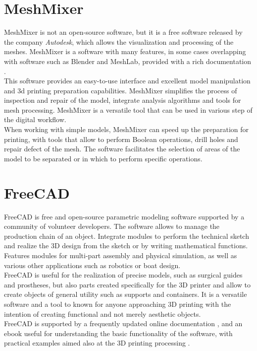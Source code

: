 \section{MeshMixer}
MeshMixer \parencite{Reference38} is not an open-source software, but it is a free software released by the company \emph{Autodesk}, which allows the visualization and processing of the meshes. MeshMixer is a software with many features, in some cases overlapping with software such as Blender and MeshLab, provided with a rich documentation \parencite{Reference39}. \\
This software provides an easy-to-use interface and excellent model manipulation and 3d printing preparation capabilities. MeshMixer simplifies the process of inspection and repair of the model, integrate analysis algorithms and tools for mesh processing. MeshMixer is a versatile tool that can be used in various step of the digital workflow. \\
When working with simple models, MeshMixer can speed up the preparation for printing, with tools that allow to perform Boolean operations, drill holes and repair defect of the mesh. The software facilitates the selection of areas of the model to be separated or in which to perform specific operations.

\section{FreeCAD}
FreeCAD \parencite{Reference40} is free and open-source parametric modeling software supported by a community of volunteer developers. The software allows to manage the production chain of an object. Integrate modules to perform the technical sketch and realize the 3D design from the sketch or by writing mathematical functions. Features modules for multi-part assembly and physical simulation, as well as various other applications such as robotics or boat design. \\
FreeCAD is useful for the realization of precise models, such as surgical guides and prostheses, but also parts created specifically for the 3D printer and allow to create objects of general utility such as supports and containers. It is a versatile software and a tool to known for anyone approaching 3D printing with the intention of creating functional and not merely aesthetic objects.\\
FreeCAD is supported by a frequently updated online documentation \parencite{Reference41}, and an ebook useful for understanding the basic functionality of the software, with practical examples aimed also at the 3D printing processing \parencite{Reference42}.

